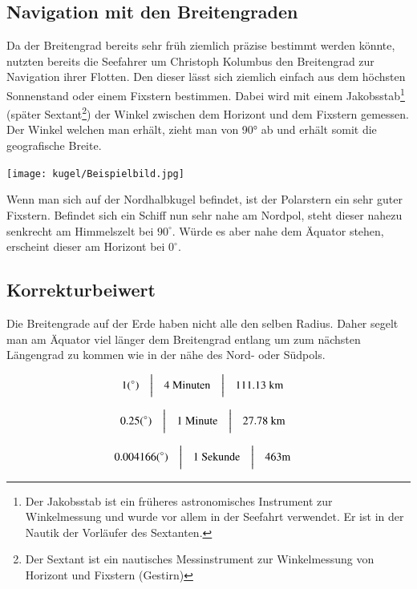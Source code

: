\begin{refsection}
\subsection{Navigation mit den Breitengraden}
Da der Breitengrad bereits sehr früh ziemlich präzise bestimmt werden könnte, nutzten bereits die Seefahrer um Christoph Kolumbus den Breitengrad zur Navigation ihrer Flotten.
Den dieser lässt sich ziemlich einfach aus dem höchsten Sonnenstand oder einem Fixstern bestimmen. Dabei wird mit einem Jakobsstab\footnote{%
Der Jakobsstab ist ein früheres astronomisches Instrument zur Winkelmessung und wurde vor allem in der Seefahrt verwendet. Er ist in der Nautik der Vorläufer des Sextanten.} (später Sextant\footnote{%
Der Sextant ist ein nautisches Messinstrument zur Winkelmessung von Horizont und Fixstern (Gestirn)}) der Winkel zwischen dem Horizont und dem Fixstern gemessen. Der Winkel welchen man erhält, zieht man von 90° ab und erhält somit die geografische Breite. \\

\begin{center}
        \texttt{[image: kugel/Beispielbild.jpg]}
\end{center}

Wenn man sich auf der Nordhalbkugel befindet, ist der Polarstern ein sehr guter Fixstern. Befindet sich ein Schiff nun sehr nahe am Nordpol, steht dieser nahezu senkrecht am Himmelszelt bei $90^{\circ}$. Würde es aber nahe dem Äquator stehen, erscheint dieser am Horizont bei $0^{\circ}$.

\subsection{Korrekturbeiwert}
Die Breitengrade auf der Erde haben nicht alle den selben Radius. Daher segelt man am Äquator viel länger dem Breitengrad entlang um zum nächsten Längengrad zu kommen wie in der nähe des Nord- oder Südpols.

\[
\begin{aligned}
&\text{1} (^{\circ})
&
&\text{\bigg \vert}
&
&\text{4 Minuten}
&
&\text{\bigg \vert}
&
&\text{111.13 km}
\end{aligned}
\]

\[
\begin{aligned}
&\text{0.25} (^{\circ})
&
&\text{\bigg \vert}
&
&\text{1 Minute}
&
&\text{\bigg \vert}
&
&\text{27.78 km}
\end{aligned}
\]

\[
\begin{aligned}
&\text{0.004166} (^{\circ})
&
&\text{\bigg \vert}
&
&\text{1 Sekunde}
&
&\text{\bigg \vert}
&
&\text{463m}
\end{aligned}
\]


\end{refsection}
